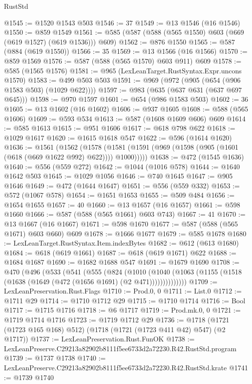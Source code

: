\begin{lexlean}{RustStd}
\begin{coremodule}
@1545 := @1520 @1543 @503
@1546 := 37
@1549 := @13 @1546 (@16 @1546)
@1550 := @859 @1549
@1561 := @585 (@587 (@588 (@565 @1550) @603 (@669 (@619 @1527) (@619 @1536))) @609)
@1562 := @876 @1550
@1565 := @587 (@884 (@619 @1550))
@1566 := 35
@1569 := @13 @1566 (@16 @1566)
@1570 := @859 @1569
@1576 := @587 (@588 (@565 @1570) @603 @911) @609
@1578 := @585 (@1565 @1576)
@1581 := @965 (LexLeanTarget.RustSyntax.Expr.uncons @1570)
@1583 := @499 @503 @503
@1591 := @969 (@972 (@905 (@654 (@906 @1583 @503) (@1029 @622))))
@1597 := @983 (@635 (@637 @631 (@637 @697 @645)))
@1598 := @970 @1597
@1601 := @654 (@986 @1583 @503)
@1602 := 36
@1605 := @13 @1602 (@16 @1602)
@1606 := @937 @1605
@1608 := @588 (@565 @1606)
@1609 := @593 @534
@1613 := @587 (@1608 @1609 @606) @609
@1614 := @585 @1613
@1615 := @951 @1606
@1617 := @618 @798 @622
@1618 := @1029 @1617
@1620 := @1615 @1618 @547
@1622 := @596 (@1614 @1620)
@1636 := @1561
    (@1562
      (@1578 (@1581 (@1591 (@969 (@1598 (@905 (@1601 (@618 (@669 @1622 @992) @622)))) @1000)))))
@1638 := @472 (@1545 @1636)
@1640 := @556 (@559 @272)
@1642 := @1044 (@1016 @578)
@1644 := @1640 @1642 @503
@1645 := @1029 @1056
@1646 := @740 @1645
@1647 := @905 @1646
@1649 := @472 (@1644 @1647)
@1651 := @556 (@559 @332)
@1653 := @572 (@1067 @578)
@1654 := @1651 @1653
@1655 := @509 @484
@1656 := @1654 @1655
@1657 := 40
@1660 := @13 @1657 (@16 @1657)
@1661 := @598 @1660
@1666 := @587 (@588 (@565 @1661) @603 @743)
@1667 := 41
@1670 := @13 @1667 (@16 @1667)
@1671 := @598 @1670
@1677 := @587 (@588 (@565 @1671) @603 @660) @609
@1678 := @1666 @1677
@1679 := @585 @1678
@1680 := LexLeanTarget.RustSyntax.Item.indexBytes
@1682 := @612 (@613 @1680)
@1684 := @618 (@619 @1661)
@1687 := @618 (@619 @1671) @622
@1688 := @1684 @1687
@1690 := @1682 @1688 @547
@1691 := @1679 @1690
@1708 := @470
    (@496
      (@533
        (@541
          (@555
            (@824
              (@1010
                (@1040 (@1063 (@1155 (@1518 (@1638 (@1649 (@472 (@1656 @1691) (@2 @471))))))))))))))
@1709 := LexLeanPreservation.Rust.Flags
@1710 := Prod.{0, 0}
@1711 := List.{0}
@1712 := @1711 @29
@1714 := @1710 @1712 @29
@1715 := @1710 @1714
@1716 := Bool
@1717 := @1715 @1716
@1718 := @6 @1717
@1719 := Prod.mk.{0, 0}
@1721 := @1719 @1714 @1716
@1723 := @1719 @1712 @29
@1736 := @1718 (@1721 (@1723 @165 @168) @512) (@1718 (@1721 (@1723 @411 @42) @547) (@2 @1717))
@1737 := LexLeanPreservation.Rust.FunOK
@1738 := LexLeanPreserve.C29213a82902b8111f5ee6733d2a72230.R42.RustStd.program
@1739 := @1737 @1738
@1740 := LexLeanPreserve.C29213a82902b8111f5ee6733d2a72230.R42.RustStd.krate
@1741 := @1739 @1740

\end{coremodule}
\end{lexlean}
